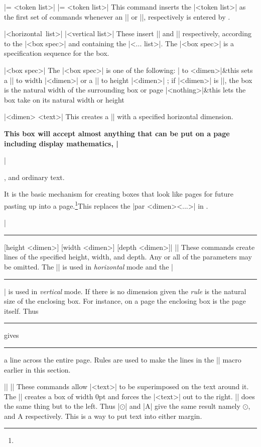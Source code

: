 \mbr
\pri\@|\everyhbox = {<token list>}|
\nbr
\pri\@|\everyvbox = {<token list>}|
\nbr
This command inserts the |<token list>| as the first set of commands whenever
an |\hbox| or |\vbox|, respectively is entered by \tex. 

\mbr
\pri\@|\hbox <box spec>{<horizontal list>}|
\nbr
\pri\@|\vbox <box spec>{<vertical list>}|
\nbr
These insert |\hbox| and |\vbox| respectively, according to the |<box spec>|
and containing the |<... list>|. The |<box spec>| is a specification sequence
for the box. 

\mbr
\pri\@|<box spec>|
\nbr
The |<box spec>| is one of the following: 
\nbr
\bshortcomlist
\noalign{\vskip -\lastskip}
| to <dimen>|&this sets a
|\hbox| to width |<dimen>| or a |\vbox| to height |<dimen>| ; if |<dimen>| is
|\hsize|, the box is the natural width of the surrounding box or page \cr
|<nothing>|&this lets the box take on its natural width or height\cr
\eshortcomlist

\pri\@|\vbox{\hsize [=] <dimen> <text>}|
\nbr
This creates a |\vbox| with a specified horizontal dimension. {\bf This box
will accept almost anything that can be put on a page including display
mathematics, |\centerline|, and ordinary text.} It is the basic mechanism for
creating boxes that look like pages for future pasting up into a 
page.\footnote{\dagger}{This replaces the |\hbox par <dimen>{<...>}| in
.}

\mbr
\pri\@|\hrule [height <dimen>] [width <dimen>] [depth <dimen>]|
\nbr
\pri\@||
\nbr
These commands create lines of the specified height, width, and depth. Any or
all of the parameters may be omitted. The |\vrule| is used in {\it horizontal}
mode and the |\hrule| is used in {\it vertical} mode. If there is no
dimension given the {\it rule} is the natural size of the enclosing box. For
instance, on a page the enclosing box is the page itself. Thus
\begintt
\par
\hrule
\endtt
gives
\par
\hrule
a line across the entire page. Rules are used to make the lines in the
|\boxit| macro earlier in this section.

\mbr
\pla\@||
\nbr
\pla\@||
\nbr
These commands allow  |<text>| to be superimposed on the text around it.
The |\rlap| creates a box of width 0pt and forces the |<text>| out to the
right. |\llap| does the same thing but to the left. Thus |$\odot$| and 
|A\llap{$\odot$}| give the same result namely $\odot$, and
A\llap{$\odot$} respectively. This is a way to put text into either margin.


